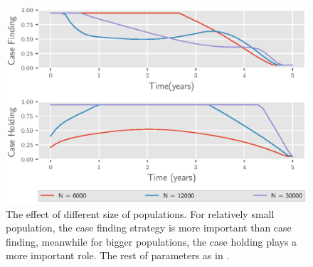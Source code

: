 %
\begin{figure}[H]
  \centering
  \includegraphics{Figures/figure_3_two_strain_tbm}
  \caption{
    The effect of different size of populations. For 
    relatively small population, the case finding strategy is more important 
    than case finding, meanwhile for  bigger populations, the case holding 
    plays a more important role. The rest of parameters as in 
    .
  }
  \label{fig:figure3twostraintbm}
\end{figure}
